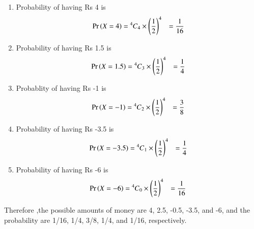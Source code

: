 \documentclass[journal,12pt,twocolumn]{IEEEtran}
\newcommand\Mycomb[2][^n]{\prescript{#1\mkern-0.5mu}{}C_{#2}}
\begin{document}
        
		\begin{enumerate}[label=(\roman*)]
	       \item	Probability of having Rs 4 is 
		       \begin{align}
			       \pr{X = 4} &= \Mycomb[4]{4} \times \left(\frac{1}{2}\right)^4  
			       &= \frac{1}{16} 
			\end{align}
		\item  Probability of having Rs 1.5 is
		       \begin{align}
			       \pr{X = 1.5} &=  \Mycomb[4]{3} \times \left(\frac{1}{2}\right)^4
			       &= \frac{1}{4} 
			\end{align}
		\item Probablity of having Rs -1 is  
			\begin{align}
				\pr{X = -1} &=  \Mycomb[4]{2} \times \left(\frac{1}{2}\right)^4
			       &= \frac{3}{8} 
			\end{align}
		\item Probability of having Rs -3.5 is
		       \begin{align}
			       \pr{X = -3.5} &=\Mycomb[4]{1} \times \left(\frac{1}{2}\right)^4 
			       &= \frac{1}{4} 
			\end{align}
		\item Probability of having Rs -6 is 
		       \begin{align}
			       \pr{X = -6} &=  \Mycomb[4]{0} \times \left(\frac{1}{2}\right)^4 
			       &= \frac{1}{16} 
			\end{align}
	\end{enumerate}
	Therefore ,the possible amounts of money are 4, 2.5, -0.5, -3.5, and -6, and the probability are 1/16, 1/4, 3/8, 1/4, and 1/16, respectively.
\end{document}
